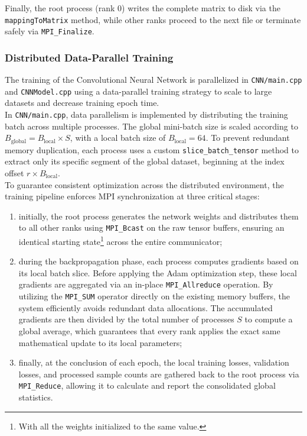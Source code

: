 Finally, the root process (rank 0) writes the complete matrix to disk via the \texttt{mappingToMatrix} method, while other ranks proceed to the next file or terminate safely via \texttt{MPI\_Finalize}.

\subsubsection{Distributed Data-Parallel Training}

The training of the Convolutional Neural Network is parallelized in \texttt{CNN/main.cpp} and \texttt{CNNModel.cpp} using a data-parallel training strategy to scale to large datasets and decrease training epoch time.\\

In \texttt{CNN/main.cpp}, data parallelism is implemented by distributing the training batch across multiple processes. The global mini-batch size is scaled according to $B_{\text{global}} = B_{\text{local}} \times S$, with a local batch size of $B_{\text{local}} = 64$. To prevent redundant memory duplication, each process uses a custom \texttt{slice\_batch\_tensor} method to extract only its specific segment of the global dataset, beginning at the index offset $r \times B_{\text{local}}$.\\

To guarantee consistent optimization across the distributed environment, the training pipeline enforces MPI synchronization at three critical stages:
\begin{enumerate}[itemsep=2ex, topsep=2ex]
    \item initially, the root process generates the network weights and distributes them to all other ranks using \texttt{MPI\_Bcast} on the raw tensor buffers, ensuring an identical starting state\footnote{With all the weights initialized to the same value.} across the entire communicator;
    \item during the backpropagation phase, each process computes gradients based on its local batch slice. Before applying the Adam optimization step, these local gradients are aggregated via an in-place \texttt{MPI\_Allreduce} operation. By utilizing the \texttt{MPI\_SUM} operator directly on the existing memory buffers, the system efficiently avoids redundant data allocations. The accumulated gradients are then divided by the total number of processes $S$ to compute a global average, which guarantees that every rank applies the exact same mathematical update to its local parameters;
    \item finally, at the conclusion of each epoch, the local training losses, validation losses, and processed sample counts are gathered back to the root process via \texttt{MPI\_Reduce}, allowing it to calculate and report the consolidated global statistics.
\end{enumerate}

